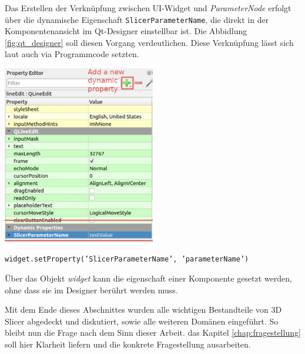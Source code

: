 \begin{minipage}{0.35\textwidth}
	Das Erstellen der Verknüpfung zwischen UI-Widget und \textit{ParameterNode}
	erfolgt über die dynamische Eigenschaft \texttt{SlicerParameterName}, die
	direkt in der Komponentenansicht im Qt-Designer einstellbar ist. Die Abbidlung
	\ref{fig:qt_designer} soll diesen Vorgang verdeutlichen. Diese Verknüpfung
	lässt sich laut \citet{slicer2024} auch via Programmcode setzten.
\end{minipage}
\hfill
\begin{minipage}{0.55\textwidth}
	\centering
	\includegraphics[width=0.5\textwidth]{img/qt_designer.jpg}
	\label{fig:qt_designer}
\end{minipage}

\texttt{widget.setProperty('SlicerParameterName', 'parameterName')}

Über das Objekt \textit{widget} kann die eigenschaft einer Komponente gesetzt werden,
ohne dass sie im Designer berührt werden muss.

Mit dem Ende dieses Abschnittes wurden alle wichtigen Bestandteile von 3D Slicer
abgedeckt und diskutiert, sowie alle weiteren Domänen eingeführt. So bleibt nun
die Frage nach dem Sinn dieser Arbeit. das Kapitel \ref{chap:fragestellung} soll
hier Klarheit liefern und die konkrete Fragestellung ausarbeiten.
